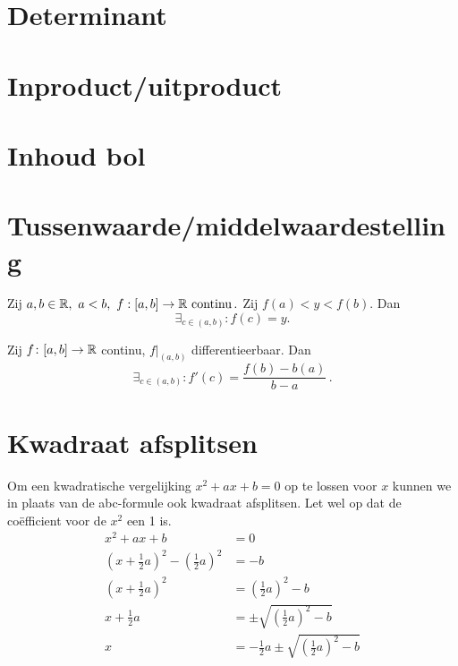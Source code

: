 \documentclass{article}
\begin{document}
    \section{Determinant}\label{sec:determinant}
    

    \section{Inproduct/uitproduct}\label{sec:inproduct/uitproduct}
    

    \section{Inhoud bol}\label{sec:inhoudBol}
    

    \section{Tussenwaarde/middelwaardestelling}\label{sec:tussenwaarde/middelwaardestelling}
    \begin{stelling}

        Zij $a,b \in \mathbb{R},\ a<b,\
            f:[a,b]\to \mathbb{R} \text{ continu}\,.
        $
        Zij $f(a)<y<f(b)$.
        Dan \[ \exists_{c\in(a,b)}:f(c)=y. \]
    \end{stelling}

    \begin{stelling}

        Zij $f\colon[a,b] \to \mathbb{R}$ continu, $f|_{(a,b)}$ differentieerbaar.
        Dan
        \[
            \exists_{c \in (a,b)} : f'(c) = \frac{f(b)-b(a)}{b-a}\,.
        \]
    \end{stelling}

    \section{Kwadraat afsplitsen}\label{sec:kwadraatAfsplitsen}
    Om een kwadratische vergelijking $x^2 + ax + b = 0$ op te lossen voor $x$ kunnen we in plaats van de abc-formule ook kwadraat afsplitsen.
    Let wel op dat de co\"efficient voor de $x^2$ een 1 is.
    \begin{align*}
        x^2 + a x + b &= 0 \\
        \left(x + \frac{1}{2} a\right)^2 - \left( \frac{1}{2}a \right)^2 &= - b \\
        \left(x + \frac{1}{2} a\right)^2 &= \left( \frac{1}{2}a \right)^2 - b \\
        x + \frac{1}{2} a &= \pm \sqrt{\left( \frac{1}{2}a \right)^2 - b} \\
        x &= -  \frac{1}{2} a \pm \sqrt{\left(\frac{1}{2}a \right)^2 - b}
    \end{align*}
\end{document}
